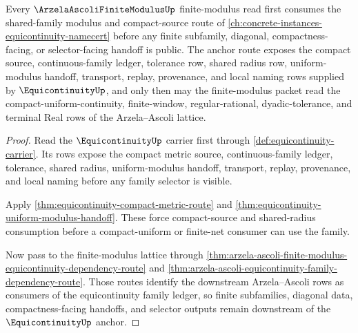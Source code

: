 \begin{theorem}
\label{thm:arzela-ascoli-finite-modulus-equicontinuity-anchor}
Every $\ArzelaAscoliFiniteModulusUp$ finite-modulus read first consumes the shared-family modulus and compact-source route of \autoref{ch:concrete-instances-equicontinuity-namecert} before any finite subfamily, diagonal, compactness-facing, or selector-facing handoff is public. The anchor route exposes the compact source, continuous-family ledger, tolerance row, shared radius row, uniform-modulus handoff, transport, replay, provenance, and local naming rows supplied by $\EquicontinuityUp$, and only then may the finite-modulus packet read the compact-uniform-continuity, finite-window, regular-rational, dyadic-tolerance, and terminal Real rows of the Arzela--Ascoli lattice.
\end{theorem}
\begin{proof}
Read the $\EquicontinuityUp$ carrier first through \autoref{def:equicontinuity-carrier}. Its rows expose the compact metric source, continuous-family ledger, tolerance, shared radius, uniform-modulus handoff, transport, replay, provenance, and local naming before any family selector is visible.

Apply \autoref{thm:equicontinuity-compact-metric-route} and \autoref{thm:equicontinuity-uniform-modulus-handoff}. These force compact-source and shared-radius consumption before a compact-uniform or finite-net consumer can use the family.

Now pass to the finite-modulus lattice through \autoref{thm:arzela-ascoli-finite-modulus-equicontinuity-dependency-route} and \autoref{thm:arzela-ascoli-equicontinuity-family-dependency-route}. Those routes identify the downstream Arzela--Ascoli rows as consumers of the equicontinuity family ledger, so finite subfamilies, diagonal data, compactness-facing handoffs, and selector outputs remain downstream of the $\EquicontinuityUp$ anchor.
\end{proof}

